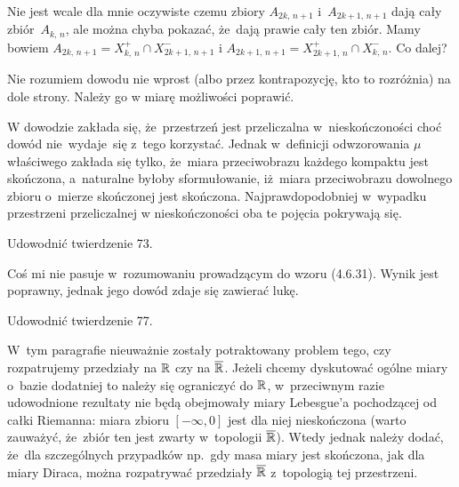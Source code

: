 \documentclass[a4paper,11pt]{article}
\begin{document}
\start {} Nie jest wcale dla mnie oczywiste czemu zbiory
$A_{ 2 k,\, n+ 1 }$ i~$A_{ 2 k + 1,\, n+ 1 }$ dają cały
zbiór~$A_{ k,\, n }$, ale można chyba pokazać, że~dają prawie cały ten
zbiór. Mamy bowiem
$A_{ 2 k,\, n + 1 } = X^{ + }_{ k,\, n } \cap X^{ - }_{ 2 k + 1,\, n +
  1 }$ i
$A_{ 2 k + 1,\, n + 1 } = X^{ + }_{ 2 k + 1,\, n } \cap X^{ - }_{ k,\,
  n }$. Co dalej?

\vspace{\spaceFour}


\start {} Nie rozumiem dowodu nie wprost (albo przez
kontrapozycję, kto to rozróżnia) na dole strony. Należy go w miarę
możliwości poprawić.

\vspace{\spaceFour}


\start {} W dowodzie zakłada się, że~przestrzeń jest
przeliczalna w~nieskończoności choć dowód nie~wydaje~się z~tego
korzystać. Jednak w~definicji odwzorowania $\mu$\dywiz właściwego
zakłada się tylko, że~miara przeciwobrazu każdego kompaktu jest
skończona, a~naturalne byłoby sformułowanie, iż~miara przeciwobrazu
dowolnego zbioru o~mierze skończonej jest skończona.
Najprawdopodobniej w~wypadku przestrzeni przeliczalnej w
nieskończoności oba te pojęcia pokrywają się.

\vspace{\spaceFour}


\start {} Udowodnić twierdzenie 73.

\vspace{\spaceFour}


\start {} Coś mi nie pasuje w~rozumowaniu prowadzącym do wzoru
(4.6.31). Wynik jest poprawny, jednak jego dowód zdaje się zawierać
lukę.

\vspace{\spaceFour}


\start {} Udowodnić twierdzenie 77.

\vspace{\spaceFour}


\start {} W~tym paragrafie nieuważnie zostały potraktowany
problem tego, czy rozpatrujemy przedziały na $\mathbb{R}$ czy na
$\overline{\mathbb{R}}$. Jeżeli chcemy dyskutować ogólne miary o~bazie
dodatniej to należy się ograniczyć do $\mathbb{R}$, w~przeciwnym razie
udowodnione rezultaty nie będą obejmowały miary Lebesgue'a pochodzącej
od całki Riemanna: miara zbioru $[ -\infty, 0 ]$ jest dla niej
nieskończona (warto zauważyć, że~zbiór ten jest zwarty w~topologii
$\overline{\mathbb{R}}$). Wtedy jednak należy dodać, że~dla szczególnych
przypadków np.~gdy masa miary jest skończona, jak dla miary Diraca,
można rozpatrywać przedziały $\overline{\mathbb{R}}$ z~topologią tej
przestrzeni.
\end{document}
